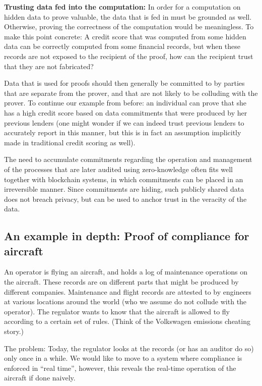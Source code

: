 \textbf{Trusting data fed into the computation: }
In order for a computation on hidden data to prove valuable, the data that is fed in must be grounded as well. Otherwise, proving the correctness of the computation would be meaningless. To make this point concrete: A credit score that was computed from some hidden data can be correctly computed from some financial records, but when these records are not exposed to the recipient of the proof, how can the recipient trust that they are not fabricated? 

Data that is used for proofs should then generally be committed to by parties that are separate from the prover, and that are not likely to be colluding with the prover. To continue our example from before: an individual can prove that she has a high credit score based on data commitments that were produced by her previous lenders (one might wonder if we can indeed trust previous lenders to accurately report in this manner, but this is in fact an assumption implicitly made in traditional credit scoring as well).   

The need to accumulate commitments regarding the operation and management of the processes that are later audited using zero-knowledge often fits well together with blockchain systems, in which commitments can be placed in an irreversible manner. Since commitments are hiding, such publicly shared data does not breach privacy, but can be used to anchor trust in the veracity of the data. 


\subsection{An example in depth: Proof of compliance for aircraft}
\label{apps:regulation-compliance:example-compliance-aircraft}

An operator is flying an aircraft, and holds a log of maintenance operations on the aircraft.  These records are on different parts that might be produced by different companies.
Maintenance and flight records are attested to by engineers at various locations around the world (who we assume do not collude with the operator). \newline
The regulator wants to know that the aircraft is allowed to fly according to a certain set of rules.
(Think of the Volkswagen emissions cheating story.)

The problem: Today, the regulator looks at the records (or has an auditor do so) only once in a while. We would like to move to a system where compliance is enforced in “real time”, however, this reveals the real-time operation of the aircraft if done naively.

